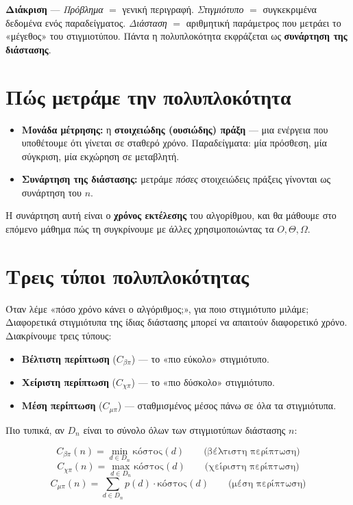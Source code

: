 \documentclass[11pt,a4paper]{article}
\begin{document}
\begin{keypoint}
\textbf{Διάκριση} --- \textit{Πρόβλημα} $=$ γενική περιγραφή. \textit{Στιγμιότυπο}
$=$ συγκεκριμένα δεδομένα ενός παραδείγματος. \textit{Διάσταση} $=$ αριθμητική
παράμετρος που μετράει το «μέγεθος» του στιγμιοτύπου. Πάντα η πολυπλοκότητα
εκφράζεται ως \textbf{συνάρτηση της διάστασης}.
\end{keypoint}

\section{Πώς μετράμε την πολυπλοκότητα}

\begin{itemize}
  \item \textbf{Μονάδα μέτρησης:} η \textbf{στοιχειώδης (ουσιώδης) πράξη} --- μια
  ενέργεια που υποθέτουμε ότι γίνεται σε σταθερό χρόνο. Παραδείγματα: μία
  πρόσθεση, μία σύγκριση, μία εκχώρηση σε μεταβλητή.
  \item \textbf{Συνάρτηση της διάστασης:} μετράμε \textit{πόσες} στοιχειώδεις
  πράξεις γίνονται ως συνάρτηση του $n$.
\end{itemize}

Η συνάρτηση αυτή είναι ο \textbf{χρόνος εκτέλεσης} του αλγορίθμου, και θα μάθουμε
στο επόμενο μάθημα πώς τη συγκρίνουμε με άλλες χρησιμοποιώντας τα
$O, \Theta, \Omega$.

\section{Τρεις τύποι πολυπλοκότητας}

Όταν λέμε «πόσο χρόνο κάνει ο αλγόριθμος;», για ποιο στιγμιότυπο μιλάμε;
Διαφορετικά στιγμιότυπα της ίδιας διάστασης μπορεί να απαιτούν διαφορετικό χρόνο.
Διακρίνουμε τρεις τύπους:

\begin{itemize}
  \item \textbf{Βέλτιστη περίπτωση} ($C_{\beta\pi}$) --- το «πιο εύκολο»
  στιγμιότυπο.
  \item \textbf{Χείριστη περίπτωση} ($C_{\chi\pi}$) --- το «πιο δύσκολο»
  στιγμιότυπο.
  \item \textbf{Μέση περίπτωση} ($C_{\mu\pi}$) --- σταθμισμένος μέσος πάνω σε όλα
  τα στιγμιότυπα.
\end{itemize}

Πιο τυπικά, αν $D_n$ είναι το σύνολο όλων των στιγμιοτύπων διάστασης $n$:

\[
C_{\beta\pi}(n) = \min_{d \in D_n} \text{κόστος}(d) \qquad \text{(βέλτιστη περίπτωση)}
\]
\[
C_{\chi\pi}(n) = \max_{d \in D_n} \text{κόστος}(d) \qquad \text{(χείριστη περίπτωση)}
\]
\[
C_{\mu\pi}(n) = \sum_{d \in D_n} p(d) \cdot \text{κόστος}(d) \qquad \text{(μέση περίπτωση)}
\]
\end{document}
